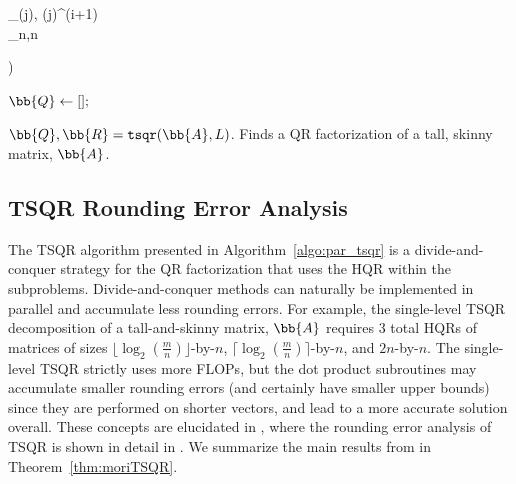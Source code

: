\begin{algorithm2e}[H]
{{\begin{bmatrix}
					_{\alpha(j), \phi(j)}^{(i+1)}\\
					_{n,n}
					\end{bmatrix}\right)\)
				}
			}
			$\bb{Q} \gets [];$\;
			\caption{$\bb{Q},\bb{R}={\tt tsqr}(\bb{A}, L)$.  Finds a QR factorization of a tall, skinny matrix, $\bb{A}$. }
			\label{algo:par_tsqr}
		\end{algorithm2e}
	\subsection{TSQR Rounding Error Analysis}
	\label{sec:TSQRre}
The TSQR algorithm presented in Algorithm~\ref{algo:par_tsqr} is a divide-and-conquer strategy for the QR factorization that uses the HQR within the subproblems. 
Divide-and-conquer methods can naturally be implemented in parallel and accumulate less rounding errors.
For example, the single-level TSQR decomposition of a tall-and-skinny matrix, $\bb{A}$ requires 3 total HQRs of matrices of sizes $\lfloor\log_{2}(\frac{m}{n})\rfloor$-by-$n$, $\lceil\log_{2}(\frac{m}{n})\rceil$-by-$n$, and $2n$-by-$n$.
The single-level TSQR strictly uses more FLOPs, but the dot product subroutines may accumulate smaller rounding errors (and certainly have smaller upper bounds) since they are performed on shorter vectors, and lead to a more accurate solution overall.
These concepts are elucidated in \cite{Mori2012}, where the rounding error analysis of TSQR is shown in detail in \cite{Mori2012}.
We summarize the main results from \cite{Mori2012} in Theorem~\ref{thm:moriTSQR}.
	
		
